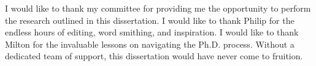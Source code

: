\begin{acknowledgments}
    I would like to thank my committee for providing me the opportunity to perform the research outlined in this dissertation. I would like to thank Philip for the endless hours of editing, word smithing, and inspiration. I would like to thank Milton for the invaluable lessons on navigating the Ph.D. process. Without a dedicated team of support, this dissertation would have never come to fruition.
\end{acknowledgments}

